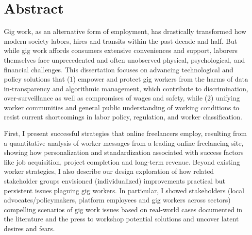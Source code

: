 \begingroup
\let\clearpage\relax
\let\cleardoublepage\relax
\let\cleardoublepage\relax

\chapter*{Abstract}
Gig work, as an alternative form of employment, has drastically transformed how modern society labors, hires and transits within the past decade and half. But while gig work affords consumers extensive conveniences and support,
laborers themselves face unprecedented and often unobserved physical, psychological, and financial challenges. 
This dissertation focuses on advancing technological and policy solutions that (1) empower and protect gig workers from the harms of data in-transparency and algorithmic management, which contribute to discrimination, over-surveillance as well as compromises of wages and safety, while (2) unifying worker communities and general public understanding of working conditions to resist current shortcomings in labor policy, regulation, and worker classification. 

First, I present successful strategies that online freelancers employ, resulting from a quantitative analysis of worker messages from a leading online freelancing site, showing how personalization and standardization associated with success factors like job acquisition, project completion and long-term revenue. Beyond existing worker strategies, I also describe our design exploration of how related stakeholder groups envisioned (individualized) improvements practical but persistent issues plaguing gig workers. In particular, I showed stakeholders (local advocates/policymakers, platform employees and gig workers across sectors) compelling scenarios of gig work issues based on real-world cases documented in the literature and the press to workshop potential solutions and uncover latent desires and fears. 

